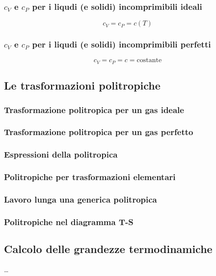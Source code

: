 \subsubsection{$c_V$ e $c_P$ per i liqudi (e solidi) incomprimibili ideali}
\[
    c_V = c_P = c(T)
\]
\subsubsection{$c_V$ e $c_P$ per i liqudi (e solidi) incomprimibili perfetti}
\[
    c_V = c_P = c = \text{costante}
\]
\subsection{Le trasformazioni politropiche}
\subsubsection{Trasformazione politropica per un gas ideale}
\subsubsection{Trasformazione politropica per un gas perfetto}
\subsubsection{Espressioni della politropica}
\subsubsection{Politropiche per trasformazioni elementari}
\subsubsection{Lavoro lunga una generica politropica}
\subsubsection{Politropiche nel diagramma T-S}
\subsection{Calcolo delle grandezze termodinamiche}
\dots